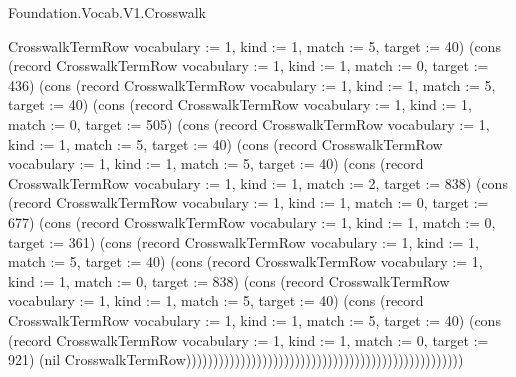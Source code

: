\begin{lexlean}{Foundation.Vocab.V1.Crosswalk}
\begin{semanticmodule}
{CrosswalkTermRow {vocabulary := 1, kind := 1, match := 5, target := 40}) (cons (record CrosswalkTermRow {vocabulary := 1, kind := 1, match := 0, target := 436}) (cons (record CrosswalkTermRow {vocabulary := 1, kind := 1, match := 5, target := 40}) (cons (record CrosswalkTermRow {vocabulary := 1, kind := 1, match := 0, target := 505}) (cons (record CrosswalkTermRow {vocabulary := 1, kind := 1, match := 5, target := 40}) (cons (record CrosswalkTermRow {vocabulary := 1, kind := 1, match := 5, target := 40}) (cons (record CrosswalkTermRow {vocabulary := 1, kind := 1, match := 2, target := 838}) (cons (record CrosswalkTermRow {vocabulary := 1, kind := 1, match := 0, target := 677}) (cons (record CrosswalkTermRow {vocabulary := 1, kind := 1, match := 0, target := 361}) (cons (record CrosswalkTermRow {vocabulary := 1, kind := 1, match := 5, target := 40}) (cons (record CrosswalkTermRow {vocabulary := 1, kind := 1, match := 0, target := 838}) (cons (record CrosswalkTermRow {vocabulary := 1, kind := 1, match := 5, target := 40}) (cons (record CrosswalkTermRow {vocabulary := 1, kind := 1, match := 5, target := 40}) (cons (record CrosswalkTermRow {vocabulary := 1, kind := 1, match := 0, target := 921}) (nil CrosswalkTermRow)))))))))))))))))))))))))))))))))))))))))))))))))))
}


\end{semanticmodule}
\end{lexlean}
